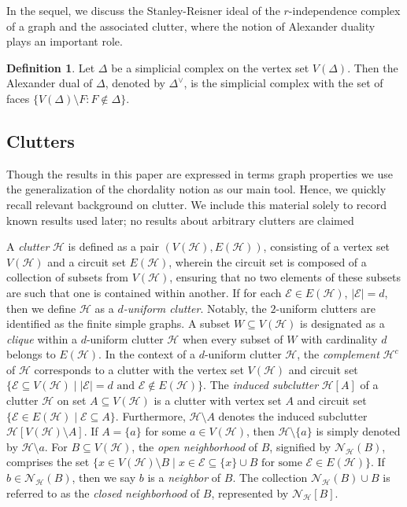 \documentclass[12pt,reqno]{amsart}
\theoremstyle{definition}
\newtheorem{definition}[proposition]{Definition}
\def\H{\mathcal{H}}
\def\E{\mathcal{E}}
\def\N{\mathcal{N}}
\begin{document}
    In the sequel, we discuss the Stanley-Reisner ideal of the $r$-independence complex of a graph and the associated clutter, where the notion of Alexander duality plays an important role.
    \begin{definition}
        Let $\Delta$ be a simplicial complex on the vertex set $V(\Delta)$. Then the Alexander dual of $\Delta$, denoted by $\Delta^{\vee}$, is the simplicial complex with the set of faces $\{V(\Delta)\setminus F:F\notin\Delta\}$.
    \end{definition}
   	
	
	
	
	
	\subsection{{Clutters}} 
Though the results in this paper are expressed in terms graph properties we use the generalization of the chordality notion as our main tool. 
Hence, we quickly recall relevant background on clutter. 
We include this material solely to record known results used later; no results about arbitrary clutters are claimed

A {\it clutter} $\H$ is defined as a pair $(V(\H), E(\H))$, consisting of a vertex set $V(\H)$ and a circuit set $E(\H)$, wherein the circuit set is composed of a collection of subsets from $V(\H)$, ensuring that no two elements of these subsets are such that one is contained within another. 
If for each $\E\in E(\H)$, $|\E|=d$, then we define $\H$ as a {\it $d$-uniform clutter}. 
Notably, the $2$-uniform clutters are identified as the finite simple graphs. 
A subset $W\subseteq V(\H)$ is designated as a {\it clique} within a $d$-uniform clutter $\H$ when every subset of $W$ with cardinality $d$ belongs to $E(\H)$. In the context of a $d$-uniform clutter $\H$, the {\it complement} $\H^c$ of $\H$ corresponds to a clutter with the vertex set $V(\H)$ and circuit set $\{\E\subseteq V(\H)\mid |\E|=d\text{ and }\E\notin E(\H)\}$. 
The {\it induced subclutter} $\H[A]$ of a clutter $\H$ on set $A\subseteq V(\H)$ is a clutter with vertex set $A$ and circuit set $\{\E\in E(\H)\mid \E\subseteq A\}$. 
Furthermore, $\H\setminus A$ denotes the induced subclutter $\H[V(\H)\setminus A]$. If $A=\{a\}$ for some $a\in V(\H)$, then $\H\setminus\{a\}$ is simply denoted by $\H\setminus a$. 
For $B\subseteq V(\H)$, the {\it open neighborhood} of $B$, signified by $\N_{\H}(B)$, comprises the set $\{x\in V(\H)\setminus B\mid x\in \E\subseteq  \{x\}\cup B \text{ for some }\E\in E(\H)\}$. 
If $b\in \N_{\H}(B)$, then we say $b$ is a {\it neighbor} of $B$. 
The collection $\N_{\H}(B)\cup B$ is referred to as the {\it closed neighborhood} of $B$, represented by $\N_{\H}[B]$.
\end{document}
